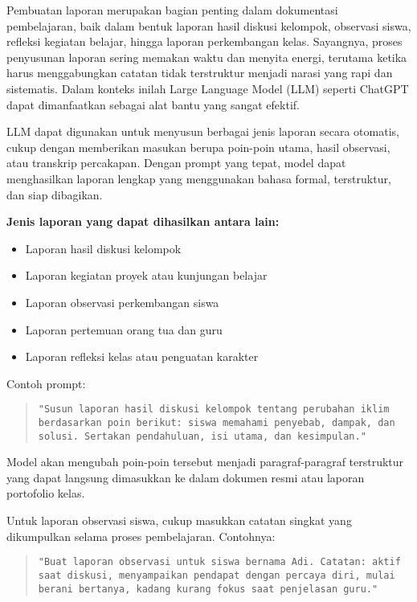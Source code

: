 Pembuatan laporan merupakan bagian penting dalam dokumentasi pembelajaran, baik dalam bentuk laporan hasil diskusi kelompok, observasi siswa, refleksi kegiatan belajar, hingga laporan perkembangan kelas. Sayangnya, proses penyusunan laporan sering memakan waktu dan menyita energi, terutama ketika harus menggabungkan catatan tidak terstruktur menjadi narasi yang rapi dan sistematis. Dalam konteks inilah Large Language Model (LLM) seperti ChatGPT dapat dimanfaatkan sebagai alat bantu yang sangat efektif.

LLM dapat digunakan untuk menyusun berbagai jenis laporan secara otomatis, cukup dengan memberikan masukan berupa poin-poin utama, hasil observasi, atau transkrip percakapan. Dengan prompt yang tepat, model dapat menghasilkan laporan lengkap yang menggunakan bahasa formal, terstruktur, dan siap dibagikan.

\textbf{Jenis laporan yang dapat dihasilkan antara lain:}
\begin{itemize}
	\item Laporan hasil diskusi kelompok
	\item Laporan kegiatan proyek atau kunjungan belajar
	\item Laporan observasi perkembangan siswa
	\item Laporan pertemuan orang tua dan guru
	\item Laporan refleksi kelas atau penguatan karakter
\end{itemize}

Contoh prompt:

\begin{quote}
	\centering
	\texttt{"Susun laporan hasil diskusi kelompok tentang perubahan iklim berdasarkan poin berikut: siswa memahami penyebab, dampak, dan solusi. Sertakan pendahuluan, isi utama, dan kesimpulan."}
\end{quote}

Model akan mengubah poin-poin tersebut menjadi paragraf-paragraf terstruktur yang dapat langsung dimasukkan ke dalam dokumen resmi atau laporan portofolio kelas.

Untuk laporan observasi siswa, cukup masukkan catatan singkat yang dikumpulkan selama proses pembelajaran. Contohnya:

\begin{quote}
	\centering
	\texttt{"Buat laporan observasi untuk siswa bernama Adi. Catatan: aktif saat diskusi, menyampaikan pendapat dengan percaya diri, mulai berani bertanya, kadang kurang fokus saat penjelasan guru."}
\end{quote}

